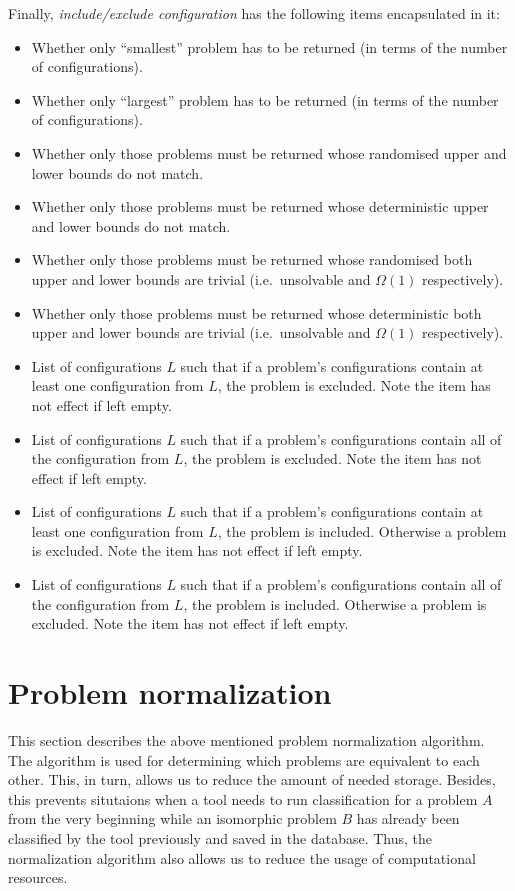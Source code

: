 Finally, \emph{include/exclude configuration} has the following
items encapsulated in it:

\begin{itemize}
  \item Whether only ``smallest'' problem has to be returned (in terms of the number of configurations).
  \item Whether only ``largest'' problem has to be returned (in terms of the number of configurations).
  \item Whether only those problems must be returned whose randomised upper
  and lower bounds do not match.
  \item Whether only those problems must be returned whose deterministic upper
  and lower bounds do not match.
  \item Whether only those problems must be returned whose randomised both
  upper and lower bounds are trivial (i.e.\ unsolvable and $\Omega(1)$
  respectively).
  \item Whether only those problems must be returned whose deterministic both
  upper and lower bounds are trivial (i.e.\ unsolvable and $\Omega(1)$
  respectively).
  \item List of configurations $L$ such that if a problem's configurations contain at least one configuration from $L$, the problem is excluded. Note
  the item has not effect if left empty.
  \item List of configurations $L$ such that if a problem's configurations contain all of the configuration from $L$, the problem is excluded. Note
  the item has not effect if left empty.
  \item List of configurations $L$ such that if a problem's configurations contain at least one configuration from $L$, the problem is included.
  Otherwise a problem is excluded.
  Note
  the item has not effect if left empty.
  \item List of configurations $L$ such that if a problem's configurations contain all of the configuration from $L$, the problem is included.
  Otherwise a problem is excluded.
  Note
  the item has not effect if left empty.
\end{itemize}

\section{Problem normalization}
\label{section:problem-normalization}

This section describes the above mentioned problem normalization
algorithm. The algorithm is used for determining which problems
are equivalent to each other. This, in turn, allows us
to reduce the amount of needed storage. Besides, this prevents
situtaions when a tool needs to run classification for a problem $A$
from the very beginning while an isomorphic problem $B$ has already been classified
by the tool previously and saved in the database. Thus, the normalization
algorithm also allows us to reduce the usage of computational resources.

